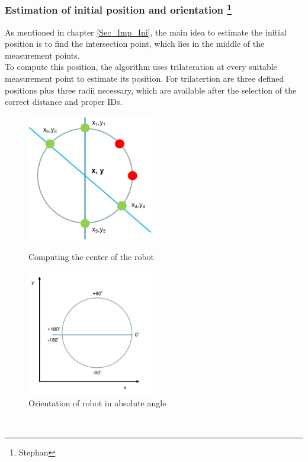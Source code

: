 \subsubsection[Estimation of initial position and orientation]{Estimation of initial position and orientation \footnote{Stephan}}
As mentioned in chapter \ref{Sec_Imp_Ini}, the main idea to estimate the initial position is to find the intersection point, which lies in the middle of the measurement points.\\
To compute this position, the algorithm uses trilateration at every suitable measurement point to estimate its position. For trilatertion are three defined positions plus three radii necessary, which are available after the selection of the correct distance and proper IDs.\\
\begin{figure}[!htbp]
\centering
\begin{minipage}{.5\textwidth}
\centering
\includegraphics[width=5.5cm]{Pictures/Center_Rob} %
\caption{Computing the center of the robot}
\label{Center}
\end{minipage}%
\begin{minipage}{.5\textwidth}
\centering
\includegraphics[width=5.5cm]{Pictures/Orientation} %
\caption{Orientation of robot in absolute angle}
\label{Angle}
\end{minipage}
\end{figure}\\
